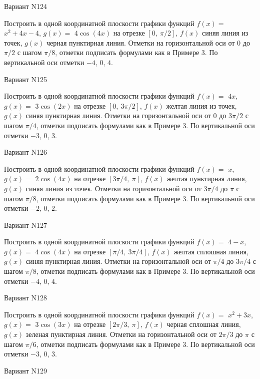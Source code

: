 \documentclass[11pt]{report}
\begin{document}
Вариант N124

Построить в одной координатной плоскости графики функций $f(x) = $
    $x^{2} + 4 x - 4$, $g(x) = $
    $4 \cos{\left(4 x \right)}$ на 
    отрезке $\left[ 0, \  \pi / 2\right]$, $f(x)$ синяя 
    линия из точек, $g(x)$ черная пунктирная линия. 
    Отметки на горизонтальной оси от $0$ до $\pi / 2$ с 
    шагом $\pi / 8$, отметки подписать формулами как в Примере 3.  
    По вертикальной оси отметки $-4$, 0, $4$.

Вариант N125

Построить в одной координатной плоскости графики функций $f(x) = $
    $4 x$, $g(x) = $
    $3 \cos{\left(2 x \right)}$ на 
    отрезке $\left[ 0, \  3 \pi / 2\right]$, $f(x)$ желтая 
    линия из точек, $g(x)$ синяя пунктирная линия. 
    Отметки на горизонтальной оси от $0$ до $3 \pi / 2$ с 
    шагом $\pi / 4$, отметки подписать формулами как в Примере 3.  
    По вертикальной оси отметки $-3$, 0, $3$.

Вариант N126

Построить в одной координатной плоскости графики функций $f(x) = $
    $x$, $g(x) = $
    $2 \cos{\left(4 x \right)}$ на 
    отрезке $\left[ 3 \pi / 4, \  \pi\right]$, $f(x)$ желтая 
    пунктирная линия, $g(x)$ синяя линия из точек. 
    Отметки на горизонтальной оси от $3 \pi / 4$ до $\pi$ с 
    шагом $\pi / 8$, отметки подписать формулами как в Примере 3.  
    По вертикальной оси отметки $-2$, 0, $2$.

Вариант N127

Построить в одной координатной плоскости графики функций $f(x) = $
    $4 - x$, $g(x) = $
    $4 \cos{\left(4 x \right)}$ на 
    отрезке $\left[ \pi / 4, \  3 \pi / 4\right]$, $f(x)$ желтая 
    сплошная линия, $g(x)$ синяя пунктирная линия. 
    Отметки на горизонтальной оси от $\pi / 4$ до $3 \pi / 4$ с 
    шагом $\pi / 8$, отметки подписать формулами как в Примере 3.  
    По вертикальной оси отметки $-4$, 0, $4$.

Вариант N128

Построить в одной координатной плоскости графики функций $f(x) = $
    $x^{2} + 3 x$, $g(x) = $
    $3 \cos{\left(3 x \right)}$ на 
    отрезке $\left[ 2 \pi / 3, \  \pi\right]$, $f(x)$ черная 
    сплошная линия, $g(x)$ зеленая пунктирная линия. 
    Отметки на горизонтальной оси от $2 \pi / 3$ до $\pi$ с 
    шагом $\pi / 6$, отметки подписать формулами как в Примере 3.  
    По вертикальной оси отметки $-3$, 0, $3$.

Вариант N129
\end{document}
